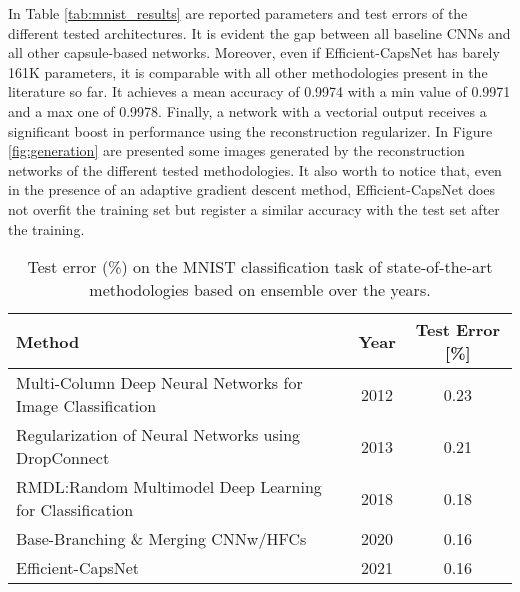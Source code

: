 \documentclass{article}
\begin{document}
In Table \ref{tab:mnist_results} are reported parameters and test errors of the different tested architectures.  It is evident the gap between all baseline CNNs and all other capsule-based networks. Moreover, even if Efficient-CapsNet has barely 161K parameters, it is comparable with all other methodologies present in the literature so far. It achieves a mean accuracy of 0.9974 with a min value of 0.9971 and a max one of 0.9978. Finally, a network with a vectorial output receives a significant boost in performance using the reconstruction regularizer. In Figure \ref{fig:generation} are presented some images generated by the reconstruction networks of the different tested methodologies. It also worth to notice that, even in the presence of an adaptive gradient descent method, Efficient-CapsNet does not overfit the training set but register a similar accuracy with the test set after the training.
\begin{table}[t]
\centering
\begin{tabular}{lcc}
\toprule
Method                                                  & Year & Test Error {[}\%{]} \\ \hline
Multi-Column Deep Neural Networks for Image Classification \cite{ciregan2012multi} & 2012 & 0.23 \\
Regularization of Neural Networks using DropConnect \cite{wan2013regularization}     & 2013 & 0.21       \\ 
RMDL:Random Multimodel Deep Learning for Classification \cite{kowsari2018rmdl} & 2018 & 0.18       \\ 
Base-Branching \& Merging CNNw/HFCs \cite{byerly2020branching}                    & 2020 & 0.16      \\
Efficient-CapsNet                                       & 2021 & 0.16       \\ \bottomrule
\end{tabular}
\caption{Test error (\%) on the MNIST classification task of state-of-the-art methodologies based on ensemble over the years.}
\label{tab:MNIST_ensemble}
\end{table}
\end{document}

